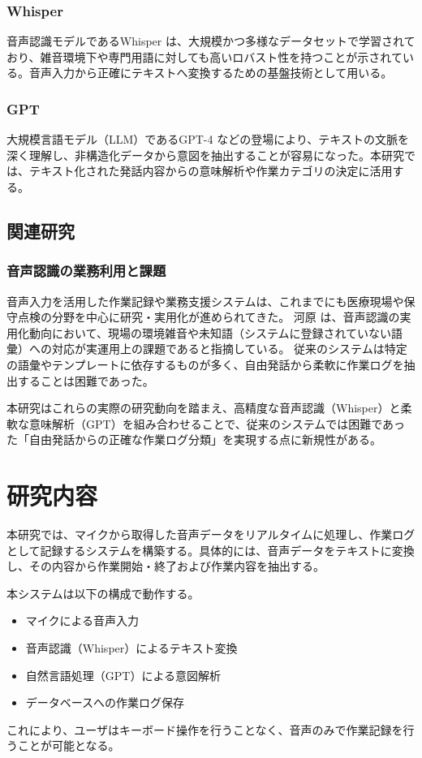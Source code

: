\documentclass[a4paper,12pt,ja=standard,lualatex]{bxjsarticle}
\begin{document}
\subsubsection{Whisper}
音声認識モデルであるWhisper \cite{radford2023whisper} は、大規模かつ多様なデータセットで学習されており、雑音環境下や専門用語に対しても高いロバスト性を持つことが示されている。音声入力から正確にテキストへ変換するための基盤技術として用いる。

\subsubsection{GPT}
大規模言語モデル（LLM）であるGPT-4 \cite{openai2023gpt4} などの登場により、テキストの文脈を深く理解し、非構造化データから意図を抽出することが容易になった。本研究では、テキスト化された発話内容からの意味解析や作業カテゴリの決定に活用する。

\subsection{関連研究}
\subsubsection{音声認識の業務利用と課題}
音声入力を活用した作業記録や業務支援システムは、これまでにも医療現場や保守点検の分野を中心に研究・実用化が進められてきた。
河原 \cite{kawahara2016} は、音声認識の実用化動向において、現場の環境雑音や未知語（システムに登録されていない語彙）への対応が実運用上の課題であると指摘している。
従来のシステムは特定の語彙やテンプレートに依存するものが多く、自由発話から柔軟に作業ログを抽出することは困難であった。

本研究はこれらの実際の研究動向を踏まえ、高精度な音声認識（Whisper）と柔軟な意味解析（GPT）を組み合わせることで、従来のシステムでは困難であった「自由発話からの正確な作業ログ分類」を実現する点に新規性がある。

\newpage

\section{研究内容}\label{sec3}
本研究では、マイクから取得した音声データをリアルタイムに処理し、作業ログとして記録するシステムを構築する。具体的には、音声データをテキストに変換し、その内容から作業開始・終了および作業内容を抽出する。

本システムは以下の構成で動作する。
\begin{itemize}
    \item マイクによる音声入力
    \item 音声認識（Whisper）によるテキスト変換
    \item 自然言語処理（GPT）による意図解析
    \item データベースへの作業ログ保存
\end{itemize}
これにより、ユーザはキーボード操作を行うことなく、音声のみで作業記録を行うことが可能となる。
\end{document}
